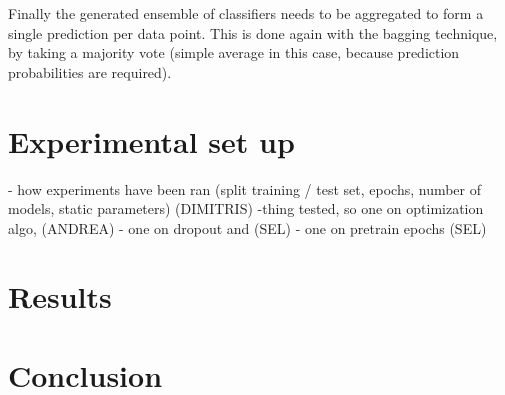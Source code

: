 \documentclass[conference]{IEEEtran}
\begin{document}
Finally the generated ensemble of classifiers needs to be aggregated to form a
single prediction per data point. This is done again with the bagging technique,
by taking a majority vote (simple average in this case, because prediction
probabilities are required).

\section{Experimental set up}
\label{sec:experiment}
- how experiments have been ran (split training / test set, epochs, number of models, static parameters) (DIMITRIS)
-thing tested, so one on optimization algo, (ANDREA)
- one on dropout and (SEL)
- one on pretrain epochs (SEL)




\section{Results}
\label{sec:results}

\section{Conclusion}
\label{sec:conclusion}

\clearpage
\appendix
\end{document}
